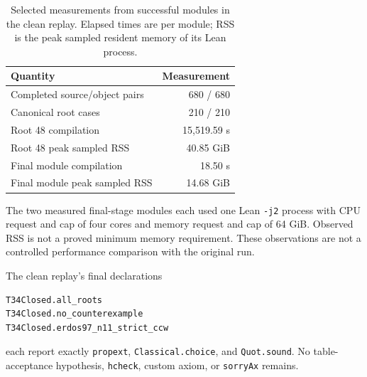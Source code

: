 \documentclass[11pt,a4paper]{article}
\theoremstyle{definition}
\newcommand{\code}[1]{\texttt{#1}}
\begin{document}
\begin{table}[htbp]
\centering\caption{Selected measurements from successful modules in the clean replay. Elapsed times are per module; RSS is the peak sampled resident memory of its Lean process.}\label{tab:clean-replay}
\begin{tabular}{lr}\toprule
Quantity & Measurement\\\midrule
Completed source/object pairs & 680 / 680\\
Canonical root cases & 210 / 210\\
Root 48 compilation & 15,519.59 s\\
Root 48 peak sampled RSS & 40.85 GiB\\
Final module compilation & 18.50 s\\
Final module peak sampled RSS & 14.68 GiB\\\bottomrule
\end{tabular}
\end{table}
The two measured final-stage modules each used one Lean \code{-j2} process with CPU request and cap of four cores and memory request and cap of 64 GiB. Observed RSS is not a proved minimum memory requirement. These observations are not a controlled performance comparison with the original run.

The clean replay's final declarations
\begin{lstlisting}
T34Closed.all_roots
T34Closed.no_counterexample
T34Closed.erdos97_n11_strict_ccw
\end{lstlisting}
each report exactly \code{propext}, \code{Classical.choice}, and \code{Quot.sound}. No table-acceptance hypothesis, \code{hcheck}, custom axiom, or \code{sorryAx} remains.
\end{document}
